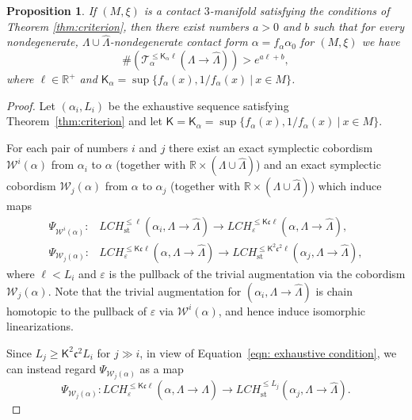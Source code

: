 \documentclass[10pt]{amsart}
\let\mathcal\mathscr
\let\epsilon\varepsilon
\let\ra\rightarrow
\newcommand{\st}{\mathrm{st}}
\theoremstyle{plain}
\newtheorem{prop}[thm]{Proposition}
\theoremstyle{definition}
\numberwithin{equation}{subsection}
\newcommand{\RR}{\mathbb{R}}
\begin{document}
\begin{prop} \label{growth}
If $(M,\xi)$ is a contact $3$-manifold satisfying the conditions of Theorem \ref{thm:criterion}, then there exist numbers $a>0$ and $b$
such that for every nondegenerate, $\Lambda\cup \widehat\Lambda$-nondegenerate contact form $\alpha=f_\alpha\alpha_0$ for $(M,\xi)$ we have
\begin{equation} \label{eqn: growth}
\#(\mathcal{T}^{\leq \mathsf{K}_\alpha \ell }_\alpha(\Lambda\ra \widehat{\Lambda})) > e^{a\ell + b},
\end{equation}
where $\ell\in \RR^+$ and $\mathsf{K}_\alpha=\sup\{ f_\alpha(x), {1/f_\alpha(x)}~|~ x\in M\}$.
\end{prop}

\begin{proof}
Let $(\alpha_i,L_i)$ be the exhaustive sequence satisfying Theorem~\ref{thm:criterion} and let $\mathsf{K}=\mathsf{K}_\alpha=\sup\{ f_\alpha(x), {1/f_\alpha(x)}~|~ x\in M\}$.

For each pair of numbers $i$ and $j$ there exist an exact symplectic cobordism $\mathcal{W}^i(\alpha)$ from $\alpha_i $ to $\alpha$ (together with $\RR\times (\Lambda\cup \widehat\Lambda)$) and an exact symplectic cobordism $\mathcal{W}_j(\alpha)$ from $\alpha$ to $\alpha_j$ (together with $\RR\times (\Lambda\cup \widehat\Lambda)$) which induce maps
\begin{align}
\Psi_{\mathcal{W}^i(\alpha)}:& LCH^{\leq \ell}_{\st}(\alpha_i, \Lambda\ra \widehat\Lambda)\to LCH^{\leq \mathsf{K} {\mathfrak c} \ell }_\epsilon (\alpha, \Lambda\ra\widehat\Lambda),\\
\Psi_{\mathcal{W}_j(\alpha)}:& LCH^{\leq \mathsf{K} {\mathfrak c} \ell}_\epsilon(\alpha,\Lambda\ra\widehat\Lambda)\to LCH^{\leq \mathsf{K}^2{\mathfrak c}^2 \ell}_{\st} (\alpha_j,\Lambda\ra\widehat\Lambda),
\end{align}
where $\ell< L_i$ and $\epsilon$ is the pullback of the trivial augmentation via the cobordism $\mathcal{W}_j(\alpha)$. Note that the trivial augmentation for $(\alpha_i, \Lambda\ra\widehat\Lambda)$ is chain homotopic to the pullback of $\epsilon$ via $\mathcal{W}^i(\alpha)$, and hence induce isomorphic linearizations.

Since $L_j\geq \mathsf{K}^2 {\mathfrak c}^2 L_i$ for $j\gg i$, in view of Equation~\eqref{eqn: exhaustive condition}, we can instead regard $\Psi_{\mathcal{W}_j(\alpha)}$ as a map
$$\Psi_{\mathcal{W}_j(\alpha)}: LCH^{\leq \mathsf{K} {\mathfrak c} \ell}_\epsilon(\alpha,\Lambda\ra\widehat\Lambda)\to LCH^{\leq L_j}_{\st} (\alpha_j,\Lambda\ra\widehat\Lambda).$$


\end{proof}
\end{document}
